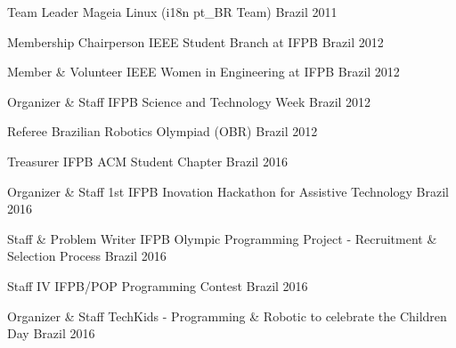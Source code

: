 

\begin{cvhonors}

  \cvhonor
    {Team Leader} %
    {Mageia Linux (i18n pt\_BR Team)} %
    {Brazil} %
    {2011} %

  \cvhonor
    {Membership Chairperson} %
    {IEEE Student Branch at IFPB} %
    {Brazil} %
    {2012} %
    
  \cvhonor
    {Member \& Volunteer} %
    {IEEE Women in Engineering at IFPB} %
    {Brazil} %
    {2012} %
        
  \cvhonor
    {Organizer \& Staff} %
    {IFPB Science and Technology Week} %
    {Brazil} %
    {2012} %
    
  \cvhonor
    {Referee} %
    {Brazilian Robotics Olympiad (OBR)} %
    {Brazil} %
    {2012} %

  \cvhonor
    {Treasurer} %
    {IFPB ACM Student Chapter} %
    {Brazil} %
    {2016} %

  \cvhonor
    {Organizer \& Staff} %
    {1st IFPB Inovation Hackathon for Assistive Technology} %
    {Brazil} %
    {2016} %

  \cvhonor
    {Staff \& Problem Writer} %
    {IFPB Olympic Programming Project - Recruitment \& Selection Process} %
    {Brazil} %
    {2016} %
    
  \cvhonor
    {Staff} %
    {IV IFPB/POP Programming Contest} %
    {Brazil} %
    {2016} %
    
  \cvhonor
    {Organizer \& Staff} %
    {TechKids - Programming \& Robotic to celebrate the Children Day} %
    {Brazil} %
    {2016} %

\end{cvhonors}

